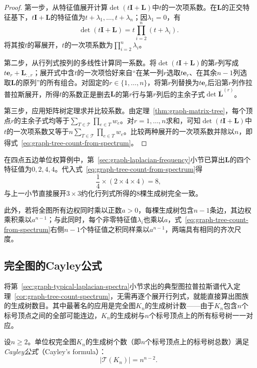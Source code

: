 \begin{proof}
第一步，从特征值展开计算$\det(t\bm I+\bm L)$中$t$的一次项系数。在$\bm L$的正交特征基下，$t\bm I+\bm L$的特征值为$t+\lambda_1,\ldots,t+\lambda_n$；因$\lambda_1=0$，有
\[
  \det(t\bm I+\bm L)=t\prod_{i=2}^n(t+\lambda_i).
\]
将其按$t$的幂展开，$t$的一次项系数为$\prod_{i=2}^n\lambda_i$。

第二步，从行列式按列的多线性计算同一系数。将$\det(t\bm I+\bm L)$的第$r$列写成$t\bm e_r + \bm L_{:,r}$；展开式中含$t$的一次项恰好来自“在某一列$r$选取$t\bm e_r$、在其余$n-1$列选取$\bm L$的原列”的所有组合。对固定的$r\in\{1,\ldots,n\}$，将第$r$列替换为$t\bm e_r$后沿第$r$列作拉普拉斯展开，所得$t$的系数正是删去$\bm L$的第$r$行与第$r$列后的主余子式$\det\overline{\bm L}^{(r)}$。

第三步，应用矩阵树定理求并比较系数。由定理~\ref{thm:graph-matrix-tree}，每个顶点$r$的主余子式均等于$\sum_{T\in\mathcal T}\prod_{e\in T}w_e$。对$r=1,\ldots,n$求和，可知$\det(t\bm I+\bm L)$中$t$的一次项系数又等于$n\sum_{T\in\mathcal T}\prod_{e\in T}w_e$。比较两种展开的一次项系数并除以$n$，即得式~\eqref{eq:graph-tree-count-from-spectrum}。
\end{proof}

在四点五边单位权算例中，第~\ref{sec:graph-laplacian-frequency}小节已算出$\bm L$的四个特征值为$0,2,4,4$。代入式~\eqref{eq:graph-tree-count-from-spectrum}得
\[
  \frac{1}{4}\times(2\times 4\times 4)=8,
\]
与上一小节直接展开$3\times 3$约化行列式所得的$8$棵生成树完全一致。

此外，若将全图所有边权同时乘以正数$a>0$，每棵生成树包含$n-1$条边，其边权乘积乘以$a^{n-1}$；与此同时，每个非零特征值$\lambda_i$也乘以$a$，式~\eqref{eq:graph-tree-count-from-spectrum}右侧$n-1$个特征值之积同样乘以$a^{n-1}$，两端具有相同的齐次尺度。

\subsection{完全图的Cayley公式}
\label{sec:graph-cayley-formula}

将第~\ref{sec:graph-typical-laplacian-spectra}小节求出的典型图拉普拉斯谱代入定理~\ref{cor:graph-tree-count-spectrum}，无需再逐个展开行列式，就能直接算出图族的生成树数目。其中最著名的应用是完全图$K_n$的生成树计数——由于$K_n$包含$n$个标号顶点之间的全部可能连边，$K_n$的生成树与$n$个标号顶点上的所有标号树一一对应。

\begin{theorem}[Cayley公式]
\label{thm:graph-cayley-formula}
设$n\geq 2$。单位权完全图$K_n$的生成树个数（即$n$个标号顶点上的标号树总数）满足\emph{Cayley公式}（Cayley's formula）：
\begin{equation}
  |\mathcal T(K_n)|=n^{n-2}.
  \label{eq:graph-cayley-count}
\end{equation}
\end{theorem}


